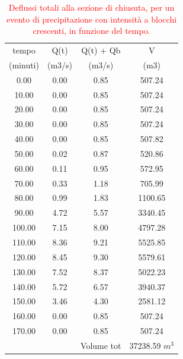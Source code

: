 \begin{table}[H] \centering
    \caption{\textcolor{red}{Deflussi totali alla sezione di chiusuta, per un evento di precipitazione con intensità a blocchi crescenti, in funzione del tempo.}}
        \begin{tabular}{cccc}
        \toprule
        tempo    & Q(t)   & Q(t) + Qb  & V        \\
        (minuti) & (m3/s) & (m3/s)     & (m3)     \\
        \midrule
        0.00     & 0.00   & 0.85       & 507.24   \\
        10.00    & 0.00   & 0.85       & 507.24   \\
        20.00    & 0.00   & 0.85       & 507.24   \\
        30.00    & 0.00   & 0.85       & 507.24   \\
        40.00    & 0.00   & 0.85       & 507.82   \\
        50.00    & 0.02   & 0.87       & 520.86   \\
        60.00    & 0.11   & 0.95       & 572.95   \\
        70.00    & 0.33   & 1.18       & 705.99   \\
        80.00    & 0.99   & 1.83       & 1100.65  \\
        90.00    & 4.72   & 5.57       & 3340.45  \\
        100.00   & 7.15   & 8.00       & 4797.28  \\
        110.00   & 8.36   & 9.21       & 5525.85  \\
        120.00   & 8.45   & 9.30       & 5579.61  \\
        130.00   & 7.52   & 8.37       & 5022.23  \\
        140.00   & 5.72   & 6.57       & 3940.37  \\
        150.00   & 3.46   & 4.30       & 2581.12  \\
        160.00   & 0.00   & 0.85       & 507.24   \\
        170.00   & 0.00   & 0.85       & 507.24   \\
                 &        & Volume tot & 37238.59 $m^3$\\
        \bottomrule
        \end{tabular}
        \end{table}

